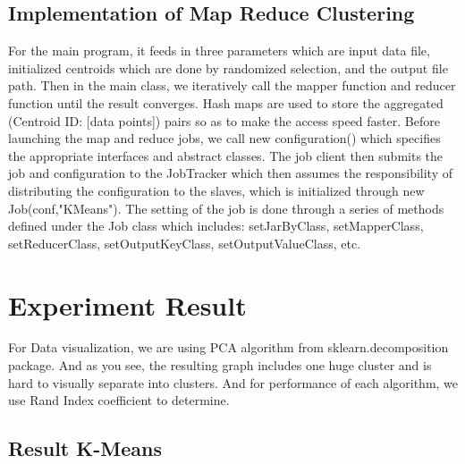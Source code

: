\documentclass[fleqn]{llncs}
\begin{document}
\subsection{Implementation of Map Reduce Clustering}
For the main program, it feeds in three parameters which are input data file, initialized centroids which are done by randomized selection, and the output file path. Then in the main class, we iteratively call the mapper function and reducer function until the result converges. Hash maps are used to store the aggregated (Centroid ID: [data points]) pairs so as to make the access speed faster. Before launching the map and reduce jobs, we call new configuration() which specifies the appropriate interfaces and abstract classes. The job client then submits the job and configuration to the JobTracker which then assumes the responsibility of distributing the configuration to the slaves, which is initialized through new Job(conf,"KMeans"). The setting of the job is done through a series of methods defined under the Job class which includes: setJarByClass, setMapperClass, setReducerClass, setOutputKeyClass, setOutputValueClass, etc. 




\section{Experiment Result}


For Data visualization, we are using PCA algorithm from sklearn.decomposition package. And as you see, the resulting graph includes one huge cluster and is hard to visually separate into clusters. And for performance of each algorithm, we use Rand Index coefficient to determine.

\subsection{Result K-Means}
\end{document}
